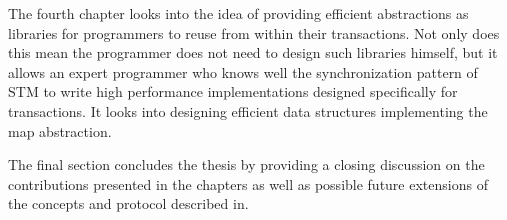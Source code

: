 
The fourth chapter looks into the idea of providing efficient abstractions
as libraries for programmers to reuse from within their transactions.
Not only does this mean the programmer does not need to design such libraries himself, but
it allows an expert programmer who knows well the synchronization pattern of STM
to write high performance implementations designed specifically for transactions.
It looks into designing efficient data structures implementing the map abstraction.


The final section concludes the thesis by providing a closing discussion on
the contributions presented in the chapters
as well as possible future extensions of the concepts and protocol described in.










